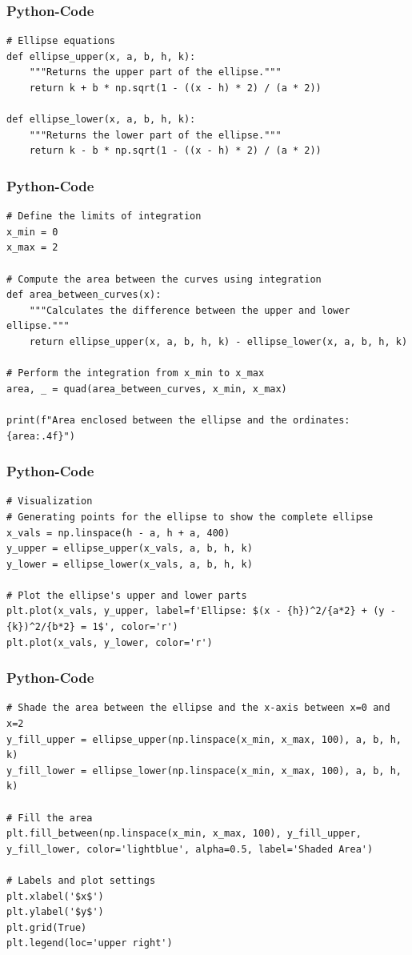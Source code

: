 \documentclass{beamer}
\begin{document}
\begin{frame}[fragile]
\frametitle{Python-Code}
\begin{lstlisting}
# Ellipse equations
def ellipse_upper(x, a, b, h, k):
    """Returns the upper part of the ellipse."""
    return k + b * np.sqrt(1 - ((x - h) * 2) / (a * 2))

def ellipse_lower(x, a, b, h, k):
    """Returns the lower part of the ellipse."""
    return k - b * np.sqrt(1 - ((x - h) * 2) / (a * 2))
\end{lstlisting}
\end{frame}

\begin{frame}[fragile]
\frametitle{Python-Code}
\begin{lstlisting}
# Define the limits of integration
x_min = 0
x_max = 2

# Compute the area between the curves using integration
def area_between_curves(x):
    """Calculates the difference between the upper and lower ellipse."""
    return ellipse_upper(x, a, b, h, k) - ellipse_lower(x, a, b, h, k)

# Perform the integration from x_min to x_max
area, _ = quad(area_between_curves, x_min, x_max)

print(f"Area enclosed between the ellipse and the ordinates: {area:.4f}")
\end{lstlisting}
\end{frame}

\begin{frame}[fragile]
\frametitle{Python-Code}
\begin{lstlisting}
# Visualization
# Generating points for the ellipse to show the complete ellipse
x_vals = np.linspace(h - a, h + a, 400)
y_upper = ellipse_upper(x_vals, a, b, h, k)
y_lower = ellipse_lower(x_vals, a, b, h, k)

# Plot the ellipse's upper and lower parts
plt.plot(x_vals, y_upper, label=f'Ellipse: $(x - {h})^2/{a*2} + (y - {k})^2/{b*2} = 1$', color='r')
plt.plot(x_vals, y_lower, color='r')
\end{lstlisting}
\end{frame}

\begin{frame}[fragile]
\frametitle{Python-Code}
\begin{lstlisting}
# Shade the area between the ellipse and the x-axis between x=0 and x=2
y_fill_upper = ellipse_upper(np.linspace(x_min, x_max, 100), a, b, h, k)
y_fill_lower = ellipse_lower(np.linspace(x_min, x_max, 100), a, b, h, k)

# Fill the area
plt.fill_between(np.linspace(x_min, x_max, 100), y_fill_upper, y_fill_lower, color='lightblue', alpha=0.5, label='Shaded Area')

# Labels and plot settings
plt.xlabel('$x$')
plt.ylabel('$y$')
plt.grid(True)
plt.legend(loc='upper right')
\end{lstlisting}
\end{frame}
\end{document}
